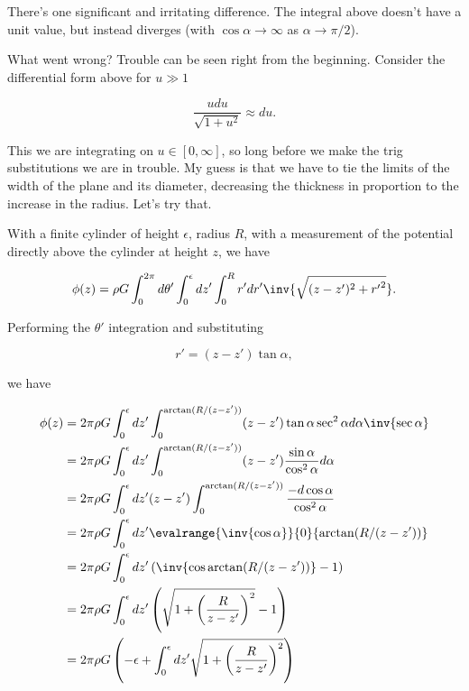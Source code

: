 There's one significant and irritating difference.  The integral above doesn't have a unit value, but instead diverges (with $\cos\alpha \rightarrow \infty$ as $\alpha \rightarrow \pi/2$).

What went wrong?  Trouble can be seen right from the beginning.  Consider the differential form above for $u \gg 1$

\begin{equation}\label{eqn:classicalMechanicsPs2:n}
\frac{u du}{\sqrt{1 + u^2}} \approx du.
\end{equation}

This we are integrating on $u \in [0, \infty]$, so long before we make the trig substitutions we are in trouble.  My guess is that we have to tie the limits of the width of the plane and its diameter, decreasing the thickness in proportion to the increase in the radius.  Let's try that.

With a finite cylinder of height $\epsilon$, radius $R$, with a measurement of the potential directly above the cylinder at height $z$, we have

\begin{equation}\label{eqn:classicalMechanicsPs2:n}
\phi(z) 
= \rho G \int_0^{2\pi} d\theta' \int_0^\epsilon dz' \int_0^R r' dr' \inv{\sqrt{(z-z')^2 + {r'}^2}}.
\end{equation}

Performing the $\theta'$ integration and substituting

\begin{equation}\label{eqn:classicalMechanicsPs2:n}
r' = (z - z') \tan\alpha,
\end{equation}

we have

\begin{align*}
\phi(z) 
&= 
2 \pi \rho G \int_0^\epsilon dz' \int_0^{\arctan(R/(z-z'))} (z - z') \tan \alpha \sec^2 \alpha d\alpha \inv{ \sec\alpha} \\
&= 
2 \pi \rho G \int_0^\epsilon dz' \int_0^{\arctan(R/(z-z'))} (z - z') \frac{\sin \alpha}{\cos^2\alpha} d\alpha \\
&= 
2 \pi \rho G \int_0^\epsilon dz' (z - z')\int_0^{\arctan(R/(z-z'))} \frac{-d\cos \alpha}{\cos^2\alpha} \\
&= 
2 \pi \rho G \int_0^\epsilon dz' \evalrange{\inv{\cos\alpha}}{0}{\arctan(R/(z-z'))} \\
&= 
2 \pi \rho G \int_0^\epsilon dz' \left( \inv{\cos\arctan(R/(z-z'))} -1 \right) \\
&= 
2 \pi \rho G \int_0^\epsilon dz' \left( \sqrt{1 + \left(\frac{R}{z-z'}\right)^2} -1 \right) \\
&=
2 \pi \rho G 
\left( -\epsilon +
\int_0^\epsilon dz' 
\sqrt{1 + \left(\frac{R}{z-z'}\right)^2} \right) 
\end{align*}

